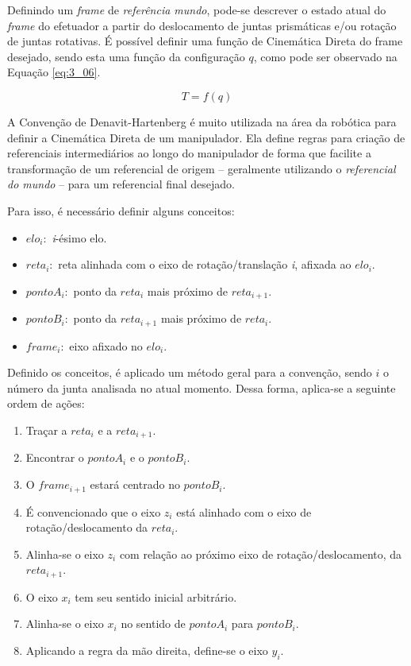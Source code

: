 Definindo um \textit{frame} de \textit{referência mundo}, pode-se descrever o estado atual do \textit{frame} do efetuador a partir do deslocamento de juntas prismáticas e/ou rotação de juntas rotativas. É possível definir uma função de Cinemática Direta do frame desejado, sendo esta uma função da configuração $q$, como pode ser observado na Equação \ref{eq:3_06}.

\begin{equation}
T = f(q)
\label{eq:3_06}
\end{equation}

A Convenção de Denavit-Hartenberg é muito utilizada na área da robótica para definir a Cinemática Direta de um manipulador. Ela define regras para criação de referenciais intermediários ao longo do manipulador de forma que facilite a transformação de um referencial de origem – geralmente utilizando o \textit{referencial do mundo} – para um referencial final desejado.

Para isso, é necessário definir alguns conceitos:

\begin{itemize}
\item $elo_i:$ \textit{i}-ésimo elo.
\item $reta_i:$ reta alinhada com o eixo de rotação/translação \textit{i}, afixada ao $elo_i$. 
\item $pontoA_i:$ ponto da $reta_i$ mais próximo de $reta_{i+1}$.
\item $pontoB_i:$ ponto da $reta_{i+1}$ mais próximo de $reta_i$.
\item $frame_i:$ eixo afixado no $elo_i$.
\end{itemize}

Definido os conceitos, é aplicado um método geral para a convenção, sendo $i$ o número da junta analisada no atual momento. Dessa forma, aplica-se a seguinte ordem de ações:

\begin{enumerate}
\item Traçar a $reta_i$ e a $reta_{i+1}$.
\item Encontrar o $pontoA_i$ e o $pontoB_i$.
\item O $frame_{i+1}$ estará centrado no $pontoB_i$.
\item É convencionado que o eixo $z_i$ está alinhado com o eixo de rotação/deslocamento da $reta_i$.
\item Alinha-se o eixo $z_i$ com relação ao próximo eixo de rotação/deslocamento, da $reta_{i+1}$.
\item O eixo $x_i$ tem seu sentido inicial arbitrário.
\item Alinha-se o eixo $x_i$ no sentido de $pontoA_i$ para $pontoB_i$.
\item Aplicando a regra da mão direita, define-se o eixo $y_i$.
\end{enumerate}

